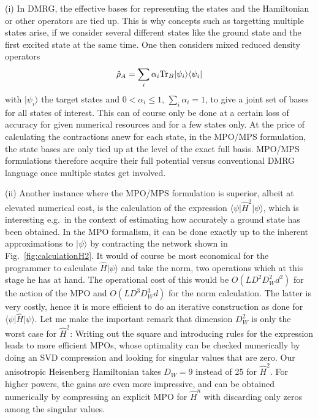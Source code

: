 \documentclass[a4paper,10pt,oneside,onecolumn,1p,times]{elsarticle}
\newcommand{\tr}{{\rm Tr }}
\newcommand{\bra}[1]{\mbox{$\langle #1  |$}}
\newcommand{\ket}[1]{\mbox{$| #1  \rangle$}}
\begin{document}
(i) In DMRG, the effective bases for representing the states and the Hamiltonian or other operators are tied up. This is why concepts such as targetting multiple states arise, if we consider several different states like the ground state and the first excited state at the same time. One then considers mixed reduced density operators
\begin{equation}
\hat{\rho}_A = \sum_{i} \alpha_i \tr_B \ket{\psi_i}\bra{\psi_i}
\end{equation}
with $\ket{\psi_i}$ the target states and $0 < \alpha_i \leq 1$, $\sum_i \alpha_i =1$, to give a joint set of bases for all states of interest. This can of course only be done at a certain loss of accuracy for given numerical resources and for a few states only. At the price of calculating the contractions anew for each state, in the MPO/MPS formulation, the state bases are only tied up at the level of the exact full basis. MPO/MPS formulations therefore acquire their full potential versus conventional DMRG language once multiple states get involved.

(ii) Another instance where the MPO/MPS formulation is superior, albeit at elevated numerical cost, is the calculation of the expression $\bra{\psi} \hat{H}^2 \ket{\psi}$, which is interesting e.g.\ in the context of estimating how accurately a ground state has been obtained. In the MPO formalism, it can be done exactly up to the inherent approximations to $\ket{\psi}$ by contracting the network shown in Fig.~\ref{fig:calculationH2}. It would of course be most economical for the programmer to calculate $\hat{H}\ket{\psi}$ and take the norm, two operations which at this stage he has at hand. The operational cost of this would be $O(LD^2D_W^2 d^2)$ for the action of the MPO and $O(LD^3 D_W^3 d)$ for the norm calculation. The latter is very costly, hence it is more efficient to do an iterative construction as done for $\bra{\psi} \hat{H} \ket{\psi}$. Let me make the important remark that dimension $D_W^2$ is only the worst case for $\hat{H}^2$\cite{Frowis10}: Writing out the square and introducing rules for the expression leads to more efficient MPOs, whose optimality can be checked numerically by doing an SVD compression and looking for singular values that are zero. Our anisotropic Heisenberg Hamiltonian takes $D_W=9$ instead of 25 for $\hat{H}^2 $. For higher powers, the gains are even more impressive, and can be obtained numerically by compressing an explicit MPO for $\hat{H}^n$ with discarding only zeros among the singular values. 
\end{document}
